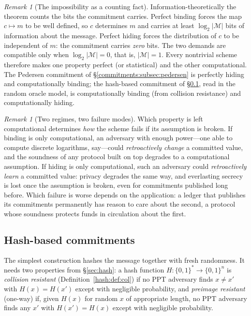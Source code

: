 \documentclass[11pt,a4paper]{article}
\theoremstyle{definition}
\theoremstyle{remark}
\newtheorem{remark}[theorem]{Remark}
\providecommand{\abs}[1]{\lvert #1 \rvert}
\begin{document}
\begin{remark}[The impossibility as a counting fact]
\label{commitments:rem:info-impossibility}
Information-theoretically the theorem counts the bits the commitment
carries. Perfect binding forces the map \(c \mapsto m\) to be well
defined, so \(c\) determines \(m\) and carries at least
\(\log_2 \abs{\mathcal M}\) bits of information about the message.
Perfect hiding forces the distribution of \(c\) to be independent of
\(m\): the commitment carries \emph{zero} bits. The two demands are
compatible only when \(\log_2 \abs{\mathcal M} = 0\), that is,
\(\abs{\mathcal M} = 1\). Every nontrivial scheme therefore makes one
property perfect (or statistical) and the other computational. The
Pedersen commitment of \S\ref{commitments:subsec:pedersen} is
perfectly hiding and computationally binding; the hash-based
commitment of \S\ref{commitments:subsec:hash}, read in the random
oracle model, is computationally binding (from collision resistance)
and computationally hiding.
\end{remark}

\begin{remark}[Two regimes, two failure modes]
\label{commitments:rem:failure-modes}
Which property is left computational determines \emph{how} the scheme
fails if its assumption is broken. If binding is only computational, an
adversary with enough power---one able to compute discrete
logarithms, say---could \emph{retroactively change} a committed
value, and the soundness of any protocol built on top degrades to a
computational assumption. If hiding is only computational, such an
adversary could \emph{retroactively learn} a committed value:
privacy degrades the same way, and everlasting secrecy is lost once
the assumption is broken, even for commitments published long before.
Which failure is worse depends on the application: a ledger that
publishes its commitments permanently has reason to care about the
second, a protocol whose soundness protects funds in circulation about
the first.
\end{remark}

\subsection{Hash-based commitments}\label{commitments:subsec:hash}

The simplest construction hashes the message together with fresh
randomness. It needs two properties from \S\ref{sec:hash}: a hash
function
\(H \colon \{0,1\}^* \to \{0,1\}^n\) is \emph{collision resistant}
(Definition~\ref{hash:def:col}) if no PPT adversary finds
\(x \ne x'\) with \(H(x) = H(x')\) except with negligible
probability, and \emph{preimage resistant} (one-way) if, given
\(H(x)\) for random \(x\) of appropriate length, no PPT adversary
finds any \(x'\) with \(H(x') = H(x)\) except with negligible
probability.
\end{document}
